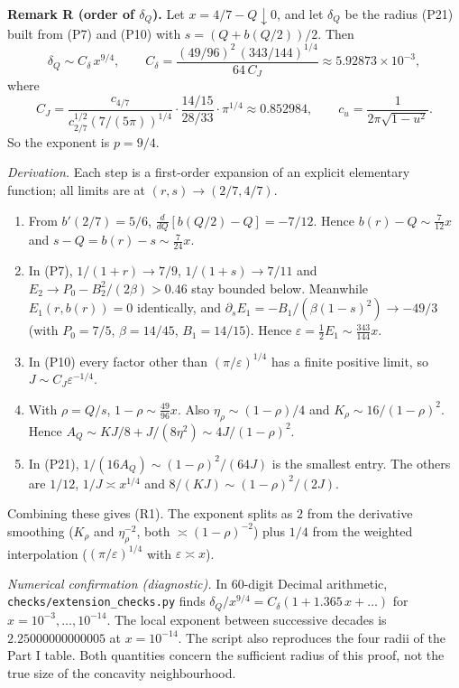 \documentclass[
  british,
  10pt,
]{article}
\providecommand{\tightlist}{%
  \setlength{\itemsep}{0pt}\setlength{\parskip}{0pt}}
\begin{document}
\textbf{Remark R (order of \(\delta_Q\)).} Let \(x=4/7-Q\downarrow0\),
and let \(\delta_Q\) be the radius (P21) built from (P7) and (P10) with
\(s=(Q+b(Q/2))/2\). Then \[
\delta_Q\sim C_\delta\,x^{9/4},\qquad
C_\delta=\frac{(49/96)^2\,(343/144)^{1/4}}{64\,C_J}\approx5.92873\times10^{-3},
\tag{R1}
\] where \[
C_J=\frac{c_{4/7}}{c_{2/7}^{1/2}(7/(5\pi))^{1/4}}\cdot\frac{14/15}{28/33}\cdot\pi^{1/4}\approx0.852984,
\qquad c_u=\frac1{2\pi\sqrt{1-u^2}} .
\] So the exponent is \(p=9/4\).

\emph{Derivation.} Each step is a first-order expansion of an explicit
elementary function; all limits are at \((r,s)\to(2/7,4/7)\).

\begin{enumerate}
\def\labelenumi{\arabic{enumi}.}
\tightlist
\item
  From \(b'(2/7)=5/6\), \(\frac{d}{dQ}[b(Q/2)-Q]=-7/12\). Hence
  \(b(r)-Q\sim\frac7{12}x\) and \(s-Q=b(r)-s\sim\frac7{24}x\).
\item
  In (P7), \(1/(1+r)\to7/9\), \(1/(1+s)\to7/11\) and
  \(E_2\to P_0-B_2^2/(2\beta)>0.46\) stay bounded below. Meanwhile
  \(E_1(r,b(r))=0\) identically, and
  \(\partial_sE_1=-B_1/(\beta(1-s)^2)\to-49/3\) (with \(P_0=7/5\),
  \(\beta=14/45\), \(B_1=14/15\)). Hence
  \(\varepsilon=\frac12E_1\sim\frac{343}{144}x\).
\item
  In (P10) every factor other than \((\pi/\varepsilon)^{1/4}\) has a
  finite positive limit, so \(J\sim C_J\varepsilon^{-1/4}\).
\item
  With \(\rho=Q/s\), \(1-\rho\sim\frac{49}{96}x\). Also
  \(\eta_\rho\sim(1-\rho)/4\) and \(K_\rho\sim16/(1-\rho)^2\). Hence
  \(A_Q\sim KJ/8+J/(8\eta^2)\sim4J/(1-\rho)^2\).
\item
  In (P21), \(1/(16A_Q)\sim(1-\rho)^2/(64J)\) is the smallest entry. The
  others are \(1/12\), \(1/J\asymp x^{1/4}\) and
  \(8/(KJ)\sim(1-\rho)^2/(2J)\).
\end{enumerate}

Combining these gives (R1). The exponent splits as \(2\) from the
derivative smoothing (\(K_\rho\) and \(\eta_\rho^{-2}\), both
\(\asymp(1-\rho)^{-2}\)) plus \(1/4\) from the weighted interpolation
(\((\pi/\varepsilon)^{1/4}\) with \(\varepsilon\asymp x\)).

\emph{Numerical confirmation (diagnostic).} In 60-digit Decimal
arithmetic, \texttt{checks/extension\_checks.py} finds
\(\delta_Q/x^{9/4}=C_\delta(1+1.365\,x+\dots)\) for
\(x=10^{-3},\dots,10^{-14}\). The local exponent between successive
decades is \(2.25000000000005\) at \(x=10^{-14}\). The script also
reproduces the four radii of the Part I table. Both quantities concern
the sufficient radius of this proof, not the true size of the concavity
neighbourhood.
\end{document}
